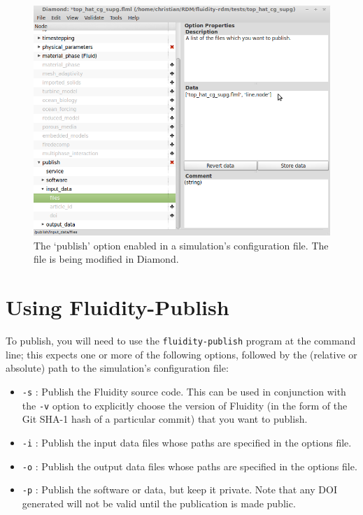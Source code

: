 \documentclass[a4paper,11pt]{report}
\begin{document}
\begin{figure}
  \centering
  \includegraphics[width=1\columnwidth]{images/diamond.png}
  \caption{The `publish' option enabled in a simulation's configuration file. The file is being modified in Diamond.}
  \label{fig:diamond}
\end{figure}

\section{Using Fluidity-Publish}
To publish, you will need to use the \texttt{fluidity-publish} program at the command line; this expects one or more of the following options, followed by the (relative or absolute) path to the simulation's configuration file:
\begin{itemize}
   \item \texttt{-s} : Publish the Fluidity source code. This can be used in conjunction with the \texttt{-v} option to explicitly choose the version of Fluidity (in the form of the Git SHA-1 hash of a particular commit) that you want to publish.
   \item \texttt{-i} : Publish the input data files whose paths are specified in the options file.
   \item \texttt{-o} : Publish the output data files whose paths are specified in the options file.
   \item \texttt{-p} : Publish the software or data, but keep it private. Note that any DOI generated will not be valid until the publication is made public.
\end{itemize}
\end{document}
